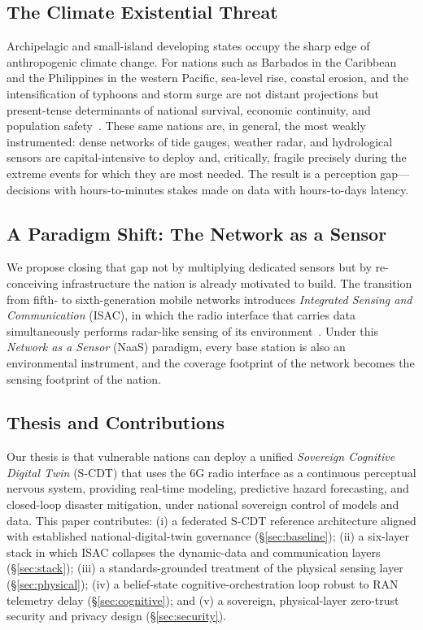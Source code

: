 \documentclass[10pt,twocolumn]{article}
\begin{document}
\subsection{The Climate Existential Threat}
Archipelagic and small-island developing states occupy the sharp edge of
anthropogenic climate change. For nations such as Barbados in the Caribbean and
the Philippines in the western Pacific, sea-level rise, coastal erosion, and the
intensification of typhoons and storm surge are not distant projections but
present-tense determinants of national survival, economic continuity, and
population safety~\cite{undp_sids,wef_barbados}. These same nations are, in
general, the most weakly instrumented: dense networks of tide gauges, weather
radar, and hydrological sensors are capital-intensive to deploy and, critically,
fragile precisely during the extreme events for which they are most needed.
The result is a perception gap---decisions with hours-to-minutes stakes made on
data with hours-to-days latency.

\subsection{A Paradigm Shift: The Network as a Sensor}
We propose closing that gap not by multiplying dedicated sensors but by
re-conceiving infrastructure the nation is already motivated to build. The
transition from fifth- to sixth-generation mobile networks introduces
\emph{Integrated Sensing and Communication} (ISAC), in which the radio interface
that carries data simultaneously performs radar-like sensing of its
environment~\cite{ericsson_isac,etsi_isc001}. Under this \emph{Network as a
Sensor} (NaaS) paradigm, every base station is also an environmental
instrument, and the coverage footprint of the network becomes the sensing
footprint of the nation.

\subsection{Thesis and Contributions}
Our thesis is that vulnerable nations can deploy a unified \emph{Sovereign
Cognitive Digital Twin} (S-CDT) that uses the 6G radio interface as a
continuous perceptual nervous system, providing real-time modeling, predictive
hazard forecasting, and closed-loop disaster mitigation, under national
sovereign control of models and data. This paper contributes: (i) a federated
S-CDT reference architecture aligned with established national-digital-twin
governance (\S\ref{sec:baseline}); (ii) a six-layer stack in which ISAC
collapses the dynamic-data and communication layers (\S\ref{sec:stack}); (iii)
a standards-grounded treatment of the physical sensing layer
(\S\ref{sec:physical}); (iv) a belief-state cognitive-orchestration loop robust
to RAN telemetry delay (\S\ref{sec:cognitive}); and (v) a sovereign,
physical-layer zero-trust security and privacy design (\S\ref{sec:security}).
\end{document}
